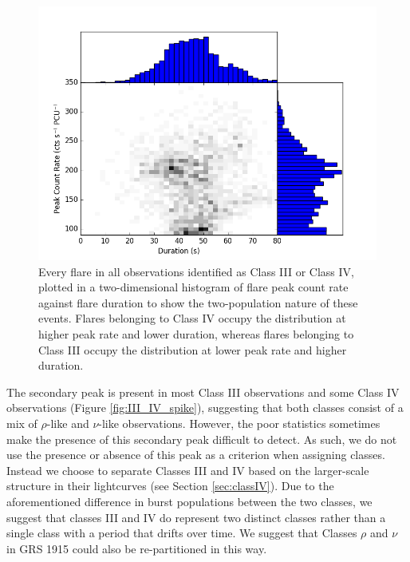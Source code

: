 \begin{figure}
    \includegraphics[width=\columnwidth, trim = 0mm 0mm 0mm 0mm]{images/GJBurst.png}
    \captionsetup{singlelinecheck=off}
    \caption{Every flare in all observations identified as Class III or Class IV, plotted in a two-dimensional histogram of flare peak count rate against flare duration to show the two-population nature of these events.  Flares belonging to Class IV occupy the distribution at higher peak rate and lower duration, whereas flares belonging to Class III occupy the distribution at lower peak rate and higher duration.}
   \label{fig:III_IV_burst}
\end{figure}

\par The secondary peak is present in most Class III observations and some Class IV observations (Figure \ref{fig:III_IV_spike}), suggesting that both classes consist of a mix of $\rho$-like and $\nu$-like observations.  However, the poor statistics sometimes make the presence of this secondary peak difficult to detect.  As such, we do not use the presence or absence of this peak as a criterion when assigning classes.  Instead we choose to separate Classes III and IV based on the larger-scale structure in their lightcurves (see Section \ref{sec:classIV}).  Due to the aforementioned difference in burst populations between the two classes, we suggest that classes III and IV do represent two distinct classes rather than a single class with a period that drifts over time.  We suggest that Classes $\rho$ and $\nu$ in GRS 1915 could also be re-partitioned in this way.

